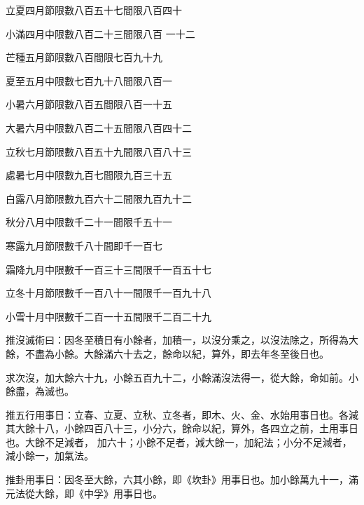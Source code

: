 \begin{pinyinscope}
 立夏四月節限數八百五十七間限八百四十



 小滿四月中限數八百二十三間限八百
 一十二



 芒種五月節限數八百間限七百九十九



 夏至五月中限數七百九十八間限八百一



 小暑六月節限數八百五間限八百一十五



 大暑六月中限數八百二十五間限八百四十二



 立秋七月節限數八百五十九間限八百八十三



 處暑七月中限數九百七間限九百三十五



 白露八月節限數九百六十二間限九百九十二



 秋分八月中限數千二十一間限千五十一



 寒露九月節限數千八十間即千一百七



 霜降九月中限數千一百三十三間限千一百五十七



 立冬十月節限數千一百八十一間限千一百九十八



 小雪十月中限數千二百一十五間限千二百二十九



 推沒滅術曰：因冬至積日有小餘者，加積一，以沒分乘之，以沒法除之，所得為大餘，不盡為小餘。大餘滿六十去之，餘命以紀，算外，即去年冬至後日也。



 求次沒，加大餘六十九，小餘五百九十二，小餘滿沒法得一，從大餘，命如前。小餘盡，為滅也。



 推五行用事日：立春、立夏、立秋、立冬者，即木、火、金、水始用事日也。各減其大餘十八，小餘四百八十三，小分六，餘命以紀，算外，各四立之前，土用事日也。大餘不足減者，
 加六十；小餘不足者，減大餘一，加紀法；小分不足減者，減小餘一，加氣法。



 推卦用事日：因冬至大餘，六其小餘，即《坎卦》用事日也。加小餘萬九十一，滿元法從大餘，即《中孚》用事日也。




\end{pinyinscope}
